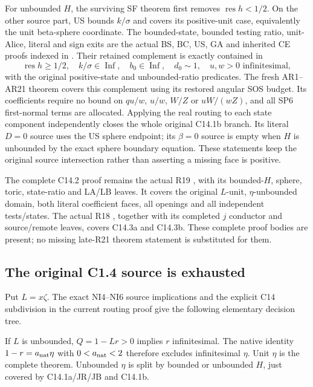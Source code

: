 For unbounded $H$, the surviving SF theorem first removes
$\operatorname{res}h<1/2$.  On the other source part, US bounds
$k/\sigma$ and covers its positive-unit case, equivalently the
unit beta-sphere coordinate.  The bounded-state, bounded testing
ratio, unit-Alice, literal and sign exits are the actual BS, BC,
US, GA and inherited CE proofs indexed in
.  Their retained
complement is exactly contained in
\[
 \operatorname{res}h\ge1/2,\quad k/\sigma\in\operatorname{Inf},
 \quad b_0\in\operatorname{Inf},\quad d_0\sim1,
 \quad u,w>0\text{ infinitesimal},                 \tag{JC5}
\]
with the original positive-state and unbounded-ratio predicates.
The fresh AR1--AR21 theorem covers this complement using its restored
angular SOS budget.  Its coefficients require no bound on
$qu/w$, $u/w$, $W/Z$ or $uW/(wZ)$, and all SP6 first-normal
terms are allocated.  Applying the real routing to each state
component independently closes the whole original C14.1b branch.
Its literal $D=0$ source uses the US sphere endpoint; its
$\beta=0$ source is empty when $H$ is unbounded by the exact sphere
boundary equation.  These statements keep the original source
intersection rather than asserting a missing face is positive.

The complete C14.2 proof remains the actual R19
, with its bounded-$H$,
sphere, toric, state-ratio and LA/LB leaves.  It covers the original
$L$-unit, $\eta$-unbounded domain, both literal coefficient faces,
all openings and all independent tests/states.  The actual R18
, together with its completed
$j$ conductor and source/remote leaves, covers C14.3a and C14.3b.
These complete proof bodies are present; no missing late-R21
theorem statement is substituted for them.

\subsection{The original C1.4 source is exhausted}
Put $L=x\zeta$.  The exact NI4--NI6 source implications and the
explicit C14 subdivision in the current routing proof give the
following elementary decision tree.

If $L$ is unbounded, $Q=1-Lr>0$ implies $r$ infinitesimal.
The native identity $1-r=a_{\rm nat}\eta$ with
$0<a_{\rm nat}<2$ therefore excludes infinitesimal $\eta$.
Unit $\eta$ is the complete
theorem.  Unbounded $\eta$ is split by bounded or unbounded $H$,
just covered by C14.1a/JR/JB and C14.1b.

